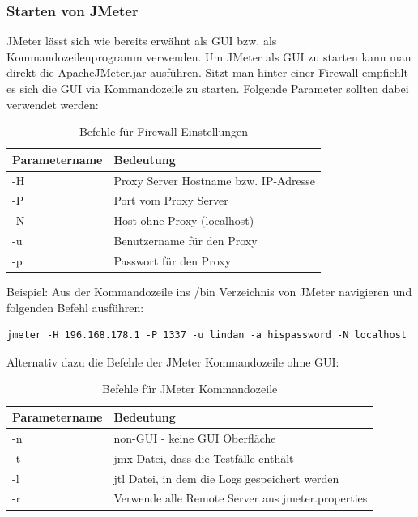 \documentclass[a4paper,12pt]{article}
\begin{document}
\subsubsection{Starten von JMeter}
JMeter lässt sich wie bereits erwähnt als GUI bzw. als Kommandozeilenprogramm verwenden.  Um JMeter als GUI zu starten kann man direkt die ApacheJMeter.jar ausführen. Sitzt man hinter einer Firewall empfiehlt es sich die GUI via Kommandozeile zu starten. Folgende Parameter  sollten dabei verwendet werden:

\begin{table}[H]
	\centering
	\begin{tabular}{|l|l|}
		\hline
		\textbf{Parametername} & \textbf{Bedeutung} \\
		\hline
		-H & Proxy Server Hostname bzw. IP-Adresse \\
		-P & Port vom Proxy Server \\
		-N & Host ohne Proxy (localhost) \\ 
		-u & Benutzername für den Proxy \\
		-p & Passwort für den Proxy \\
		\hline
	\end{tabular}
	\caption[tab_parameter_gui]{Befehle für Firewall Einstellungen}
	\label{tab_parameter_gui}
\end{table}

Beispiel: Aus der Kommandozeile ins /bin Verzeichnis von JMeter navigieren und folgenden Befehl ausführen: 
\begin{lstlisting}
jmeter -H 196.168.178.1 -P 1337 -u lindan -a hispassword -N localhost
\end{lstlisting}
Alternativ dazu die Befehle der JMeter Kommandozeile ohne GUI:

\begin{table}[H]
	\centering
	\begin{tabular}{|l|l|}
		\hline
		\textbf{Parametername} & \textbf{Bedeutung} \\
		\hline
		-n & non-GUI - keine GUI Oberfläche \\
		-t & jmx Datei, dass die Testfälle enthält \\
		-l & jtl Datei, in dem die Logs gespeichert werden \\ 
		-r & Verwende alle Remote Server aus jmeter.properties \\
		\hline
	\end{tabular}
	\caption[tab_parameter_non_gui]{Befehle für JMeter Kommandozeile}
	\label{tab_parameter_non_gui}
\end{table}
\end{document}
